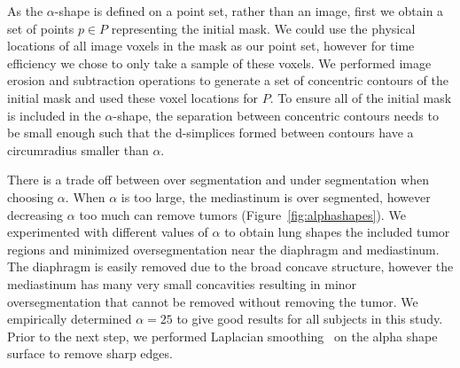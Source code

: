 \documentclass{llncs}
\begin{document}
As the $\alpha$-shape is defined on a point set, rather than an image, first we obtain a set of points $p \in P$ representing the initial mask. We could use the physical locations of all image voxels in the mask as our point set, however for time efficiency we chose to only take a sample of these voxels. We performed image erosion and subtraction operations to generate a set of concentric contours of the initial mask and used these voxel locations for $P$. To ensure all of the initial mask is included in the $\alpha$-shape, the separation between concentric contours needs to be small enough such that the d-simplices formed between contours have a circumradius smaller than $\alpha$. 


There is a trade off between over segmentation and under segmentation when choosing $\alpha$. When $\alpha$ is too large, the mediastinum is over segmented, however decreasing $\alpha$ too much can remove tumors (Figure~\ref{fig:alphashapes}).  We experimented with different values of $\alpha$ to obtain lung shapes the included tumor regions and minimized oversegmentation near the diaphragm and mediastinum. The diaphragm is easily removed due to the broad concave structure, however the mediastinum has many very small concavities resulting in minor oversegmentation that cannot be removed without removing the tumor. We empirically determined $ \alpha=25 $ to give good results for all subjects in this study. Prior to the next step, we performed Laplacian smoothing~\cite{herrmann1976} on the alpha shape surface to remove sharp edges. 
\end{document}
